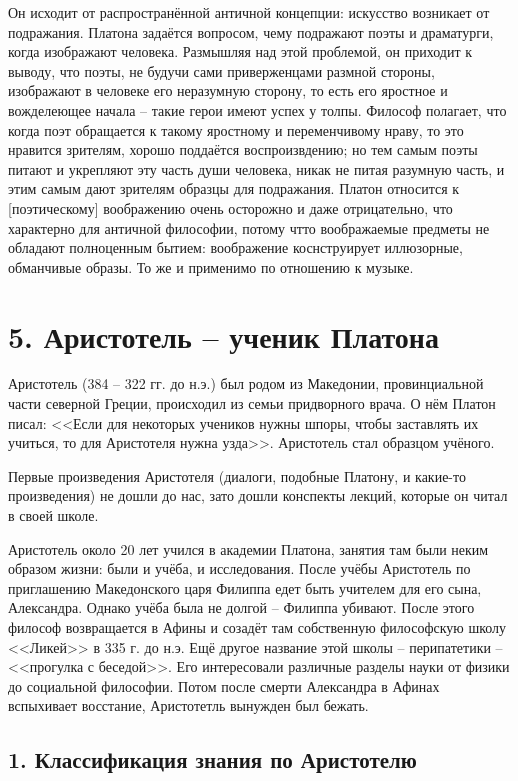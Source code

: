 \documentclass[a4paper, 12pt]{book} %
\begin{document}
Он исходит от распространённой античной концепции: искусство возникает от подражания. Платона задаётся вопросом, чему подражают поэты и драматурги, когда изображают человека. Размышляя над этой проблемой, он приходит к выводу, что поэты, не будучи сами приверженцами размной стороны, изображают в человеке его неразумную сторону, то есть его яростное и вожделеющее начала -- такие герои имеют успех у толпы. Философ полагает, что когда поэт обращается к такому яростному и переменчивому нраву, то это нравится зрителям, хорошо поддаётся воспроизвдению; но тем самым поэты питают и укрепляют эту часть души человека, никак не питая разумную часть, и этим самым дают зрителям образцы для подражания. Платон относится к [поэтическому] воображению очень осторожно и даже отрицательно, что характерно для античной философии, потому чтто воображаемые предметы не обладают полноценным бытием: воображение коснструирует иллюзорные, обманчивые образы.  То же и применимо по отношению к музыке.

\section*{5. Аристотель -- ученик Платона}

Аристотель (384 -- 322 гг. до н.э.) был родом из Македонии, провинциальной части северной Греции, происходил из семьи придворного врача.
О нём Платон писал: <<Если для некоторых учеников нужны шпоры, чтобы заставлять их учиться, то для Аристотеля нужна узда>>. Аристотель стал образцом учёного. 

Первые произведения Аристотеля (диалоги, подобные Платону, и какие-то произведения) не дошли до нас, зато дошли конспекты лекций, которые он читал в своей школе. 

Аристотель около 20 лет учился в академии Платона, занятия там были неким образом жизни: были и учёба, и исследования. После учёбы Аристотель по приглашению Македонского царя Филиппа едет быть учителем для его сына, Александра. Однако учёба была не долгой -- Филиппа убивают. После этого философ возвращается в Афины и созадёт там собственную философскую школу <<Ликей>> в 335 г. до н.э. Ещё другое название этой  школы -- перипатетики -- <<прогулка с беседой>>. Его интересовали различные разделы науки от физики до социальной философии. Потом после смерти Александра в Афинах вспыхивает восстание, Аристотетль вынужден был бежать. 

\subsection*{1. Классификация знания по Аристотелю}
\end{document}

